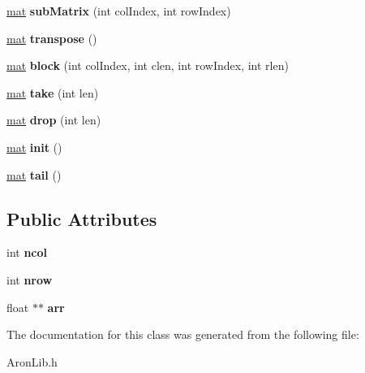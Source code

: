 \begin{DoxyCompactItemize}
\mbox{\hyperlink{class_matrix_vector_1_1mat}{mat}} {\bfseries sub\+Matrix} (int col\+Index, int row\+Index)
\item 
\mbox{\label{class_matrix_vector_1_1mat_abe8ff1f6f29fe9e406b755c3f655dd18}} 
\mbox{\hyperlink{class_matrix_vector_1_1mat}{mat}} {\bfseries transpose} ()
\item 
\mbox{\label{class_matrix_vector_1_1mat_aa623e369c2af8582646a44d0c7614db0}} 
\mbox{\hyperlink{class_matrix_vector_1_1mat}{mat}} {\bfseries block} (int col\+Index, int clen, int row\+Index, int rlen)
\item 
\mbox{\label{class_matrix_vector_1_1mat_a24f0cefca0d6f79545c2f130fda0b82c}} 
\mbox{\hyperlink{class_matrix_vector_1_1mat}{mat}} {\bfseries take} (int len)
\item 
\mbox{\label{class_matrix_vector_1_1mat_a7cd7e57bf6907ee80445afdb462fd095}} 
\mbox{\hyperlink{class_matrix_vector_1_1mat}{mat}} {\bfseries drop} (int len)
\item 
\mbox{\label{class_matrix_vector_1_1mat_a96ad31de366c370206569f0be9e1de5e}} 
\mbox{\hyperlink{class_matrix_vector_1_1mat}{mat}} {\bfseries init} ()
\item 
\mbox{\label{class_matrix_vector_1_1mat_a81893c6dae060972bce5ff67c7a07ee9}} 
\mbox{\hyperlink{class_matrix_vector_1_1mat}{mat}} {\bfseries tail} ()
\end{DoxyCompactItemize}
\subsection*{Public Attributes}
\begin{DoxyCompactItemize}
\item 
\mbox{\label{class_matrix_vector_1_1mat_a592d970921c2d031bf648d70e5f448dc}} 
int {\bfseries ncol}
\item 
\mbox{\label{class_matrix_vector_1_1mat_af448f5d4ef6da3b9c6d72870f690695d}} 
int {\bfseries nrow}
\item 
\mbox{\label{class_matrix_vector_1_1mat_a5f1dd191eaa81d863fd0c2a546cf7e67}} 
float $\ast$$\ast$ {\bfseries arr}
\end{DoxyCompactItemize}


The documentation for this class was generated from the following file\+:\begin{DoxyCompactItemize}
\item 
Aron\+Lib.\+h\end{DoxyCompactItemize}
